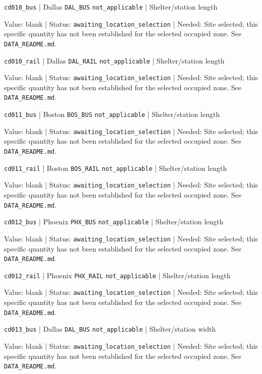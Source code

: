 \nolinkurl{cd010_bus} | Dallas \nolinkurl{DAL_BUS} \nolinkurl{not_applicable} | Shelter/station length

Value: blank | Status: \nolinkurl{awaiting_location_selection} | Needed: Site selected; this specific quantity has not been established for the selected occupied zone. See \nolinkurl{DATA_README.md}.

\nolinkurl{cd010_rail} | Dallas \nolinkurl{DAL_RAIL} \nolinkurl{not_applicable} | Shelter/station length

Value: blank | Status: \nolinkurl{awaiting_location_selection} | Needed: Site selected; this specific quantity has not been established for the selected occupied zone. See \nolinkurl{DATA_README.md}.

\nolinkurl{cd011_bus} | Boston \nolinkurl{BOS_BUS} \nolinkurl{not_applicable} | Shelter/station length

Value: blank | Status: \nolinkurl{awaiting_location_selection} | Needed: Site selected; this specific quantity has not been established for the selected occupied zone. See \nolinkurl{DATA_README.md}.

\nolinkurl{cd011_rail} | Boston \nolinkurl{BOS_RAIL} \nolinkurl{not_applicable} | Shelter/station length

Value: blank | Status: \nolinkurl{awaiting_location_selection} | Needed: Site selected; this specific quantity has not been established for the selected occupied zone. See \nolinkurl{DATA_README.md}.

\nolinkurl{cd012_bus} | Phoenix \nolinkurl{PHX_BUS} \nolinkurl{not_applicable} | Shelter/station length

Value: blank | Status: \nolinkurl{awaiting_location_selection} | Needed: Site selected; this specific quantity has not been established for the selected occupied zone. See \nolinkurl{DATA_README.md}.

\nolinkurl{cd012_rail} | Phoenix \nolinkurl{PHX_RAIL} \nolinkurl{not_applicable} | Shelter/station length

Value: blank | Status: \nolinkurl{awaiting_location_selection} | Needed: Site selected; this specific quantity has not been established for the selected occupied zone. See \nolinkurl{DATA_README.md}.

\nolinkurl{cd013_bus} | Dallas \nolinkurl{DAL_BUS} \nolinkurl{not_applicable} | Shelter/station width

Value: blank | Status: \nolinkurl{awaiting_location_selection} | Needed: Site selected; this specific quantity has not been established for the selected occupied zone. See \nolinkurl{DATA_README.md}.

